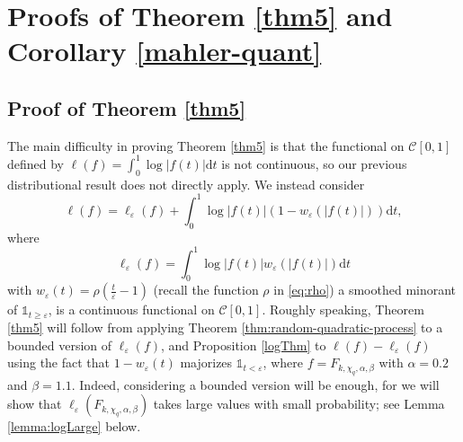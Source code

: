 \documentclass[12pt, a4paper]{amsart}
\theoremstyle{remark}
\newcommand{\ud}{\mathrm{d}}
\newcommand{\abs}[1]{\left|#1\right|}
\begin{document}
\section{Proofs of Theorem \ref{thm5} and Corollary \ref{mahler-quant}}

\subsection{Proof of Theorem \ref{thm5}} 

The main difficulty in proving Theorem \ref{thm5} is that the functional on $\mathscr{C}[0,1]$ defined by $\ell(f)=\int_{0}^1\log \abs{f(t)}\ud t$ is not continuous, so our previous distributional result does not directly apply.
We instead consider 
$$\ell(f) = \ell_{\varepsilon}(f) + \int_{0}^{1}\log \abs{f(t)}(1-w_{\varepsilon}(\lvert f(t)\rvert))\ud t,$$ where
$$\ell_{\varepsilon}(f)=\int_{0}^{1}\log \abs{f(t)}w_{\varepsilon}(\lvert f(t)\rvert)\ud t$$ with $w_{\varepsilon}(t)=\rho\left(\frac{t}{\varepsilon} - 1\right)$ (recall the function $\rho$ in \eqref{eq:rho}) a smoothed minorant of $\mathds 1_{t\geq\varepsilon}$, is a continuous functional on $\mathscr{C}[0,1]$. Roughly speaking, Theorem \ref{thm5} will follow from applying Theorem \ref{thm:random-quadratic-process} to a bounded version of $\ell_{\varepsilon}(f)$, and Proposition \ref{logThm} to $\ell(f) - \ell_{\varepsilon}(f)$ using the fact that $1-w_{\varepsilon}(t)$ majorizes $\mathds 1_{t<\varepsilon}$, where $f=F_{k, \chi_q, \alpha, \beta}$ with $\alpha=0.2$ and $\beta =1.1$. Indeed, considering a bounded version will be enough, for we will show that $\ell_{\varepsilon}(F_{k, \chi_q, \alpha, \beta})$ takes large values with small probability; see Lemma \ref{lemma:logLarge} below.
\end{document}

